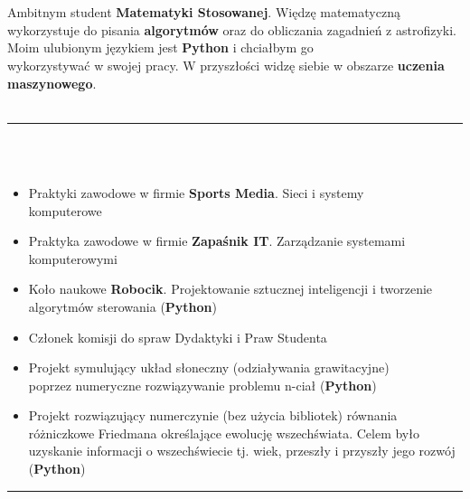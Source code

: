 \documentclass[10pt]{article}
\begin{document}
    \begin{minipage}[t]{0.60\textwidth}
        \fontsize{10pt}{10pt} \\ \\
        Ambitnym student \textbf{Matematyki Stosowanej}. Więdzę matematyczną wykorzystuje do pisania \textbf{algorytmów} oraz do obliczania zagadnień z astrofizyki.
        Moim ulubionym językiem jest \textbf{Python} i chciałbym go \\wykorzystywać w swojej pracy. W przyszłości widzę siebie w obszarze \textbf{uczenia maszynowego}. \\ \\
        \rule{11cm}{1pt} \\ \\
        \fontsize{10pt}{10pt}
        \begin{itemize}[leftmargin=*]
            \setlength{\parskip}{0pt}
            \item Praktyki zawodowe w firmie \textbf{Sports Media}. Sieci i systemy \\ komputerowe
            \item Praktyka zawodowe w firmie \textbf{Zapaśnik IT}. Zarządzanie systemami  \\komputerowymi
            \item Koło naukowe \textbf{Robocik}. Projektowanie sztucznej inteligencji i tworzenie algorytmów sterowania (\textbf{Python})
            \item Członek komisji do spraw Dydaktyki i Praw Studenta
            \item Projekt symulujący układ słoneczny (odziaływania grawitacyjne) \\ poprzez numeryczne rozwiązywanie problemu n-ciał  (\textbf{Python})
            \item Projekt rozwiązujący numerczynie (bez użycia bibliotek) równania różniczkowe Friedmana określające ewolucję wszechświata.
            Celem było uzyskanie informacji o wszechświecie tj. wiek, przeszły i przyszły jego rozwój (\textbf{Python})
        \end{itemize}
        \rule{11cm}{1pt} \\ \\
        \fontsize{10pt}{10pt}
        \begin{itemize}[leftmargin=*]
            \setlength{\parskip}{0pt}

\end{itemize}
\end{minipage}
\end{document}
